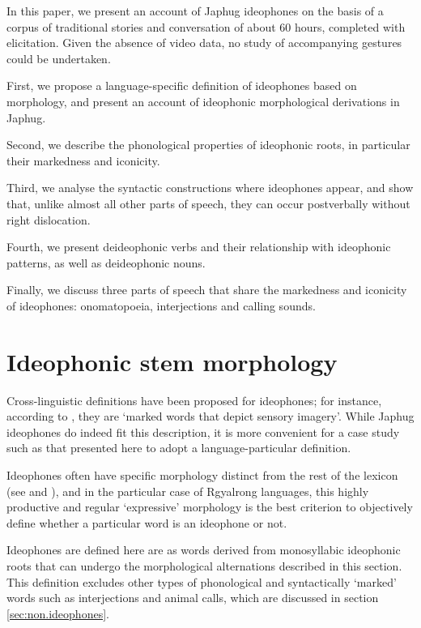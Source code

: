 \documentclass[oldfontcommands,oneside,a4paper,11pt]{article}
\begin{document}
 
 In this paper, we present an account of Japhug ideophones on the basis of a corpus of traditional stories and conversation of about 60 hours, completed with elicitation. Given the absence of video data, no study of accompanying gestures could be undertaken.
 
  First, we propose a language-specific definition of ideophones  based on morphology, and present an account of ideophonic morphological derivations in Japhug.
  
   Second,  we describe the phonological properties of ideophonic roots, in particular their markedness and iconicity.
 
  Third, we analyse the syntactic constructions where ideophones appear, and show that, unlike almost all other parts of speech, they can occur postverbally without right dislocation.
  
  Fourth, we present deideophonic verbs and their relationship with ideophonic patterns, as well as deideophonic nouns.  
  
  Finally, we discuss   three parts of speech that share  the  markedness and iconicity of ideophones: onomatopoeia, interjections and calling sounds.



\section{Ideophonic stem morphology} \label{sec:ideo:morpho}


Cross-linguistic definitions have been proposed for ideophones; for instance, according to \citet[2]{dingemanse14}, they are `marked words that depict sensory imagery'.  While  Japhug ideophones do indeed fit this description, it is more convenient for a case study such as that presented here to adopt a language-particular definition. 

Ideophones often have specific morphology distinct from the rest of the lexicon (see   \citealt{diffloth76expressives} and  \citealt{zwicky87expressive}), and in the particular case of Rgyalrong languages, this highly productive and regular  `expressive' morphology is the best criterion to objectively define whether a particular word is an ideophone or not. 

Ideophones are defined here are as words derived from monosyllabic ideophonic roots that can undergo the morphological alternations described in this section. This definition excludes other types of phonological and syntactically `marked' words such as interjections and animal calls, which are discussed in section \ref{sec:non.ideophones}.  
 
\end{document}
